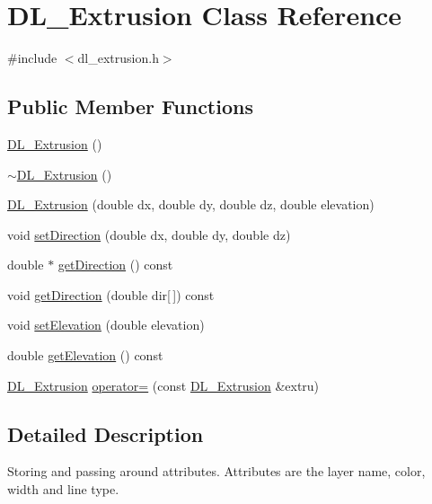\hypertarget{classDL__Extrusion}{\section{D\-L\-\_\-\-Extrusion Class Reference}
\label{classDL__Extrusion}
}


{\ttfamily \#include $<$dl\-\_\-extrusion.\-h$>$}

\subsection*{Public Member Functions}
\begin{DoxyCompactItemize}
\item 
\hyperlink{classDL__Extrusion_a9a85147996b6438b3f3f472146243cc3}{D\-L\-\_\-\-Extrusion} ()
\item 
\hyperlink{classDL__Extrusion_aee6fcb5ac8bba1858c8eeb785464c7a7}{$\sim$\-D\-L\-\_\-\-Extrusion} ()
\item 
\hyperlink{classDL__Extrusion_ae5f0f06b79873e894d0b20d1cb01ae38}{D\-L\-\_\-\-Extrusion} (double dx, double dy, double dz, double elevation)
\item 
void \hyperlink{classDL__Extrusion_a30b12a53645a96349add841ffc453ed3}{set\-Direction} (double dx, double dy, double dz)
\item 
double $\ast$ \hyperlink{classDL__Extrusion_a5b7f22647d721b0d4a042a38832e1452}{get\-Direction} () const 
\item 
void \hyperlink{classDL__Extrusion_a5142880d02f430c7b1667a59c514e299}{get\-Direction} (double dir\mbox{[}$\,$\mbox{]}) const 
\item 
void \hyperlink{classDL__Extrusion_a3c73bd98b7fd70f54a39f7edf9cd951a}{set\-Elevation} (double elevation)
\item 
double \hyperlink{classDL__Extrusion_aa114cffc0148ad7d9c928f31e34648b6}{get\-Elevation} () const 
\item 
\hyperlink{classDL__Extrusion}{D\-L\-\_\-\-Extrusion} \hyperlink{classDL__Extrusion_ad7629524f016f4e3b92572a40e1284dc}{operator=} (const \hyperlink{classDL__Extrusion}{D\-L\-\_\-\-Extrusion} \&extru)
\end{DoxyCompactItemize}


\subsection{Detailed Description}
Storing and passing around attributes. Attributes are the layer name, color, width and line type.

